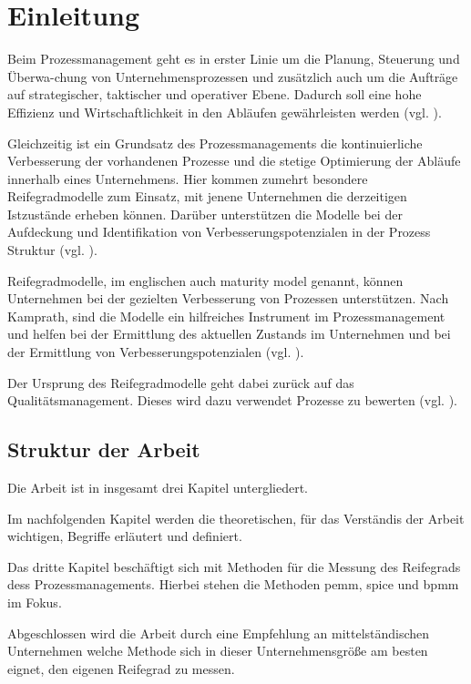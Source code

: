 \newpage
\fancyhead[L]{\textcolor{lightgrey}{\nouppercase{\rightmark}}}

\section{Einleitung}

Beim Prozessmanagement geht es in erster Linie um die Planung, Steuerung und Überwa-chung von Unternehmensprozessen und zusätzlich auch um die
Aufträge auf strategischer, taktischer und operativer Ebene. Dadurch soll eine hohe Effizienz und Wirtschaftlichkeit in den Abläufen gewährleisten
werden (vgl. \cite[S.5]{Schmidt2012}). \par

Gleichzeitig ist ein Grundsatz des Prozessmanagements die kontinuierliche Verbesserung der vorhandenen Prozesse und die stetige Optimierung der Abläufe
innerhalb eines Unternehmens. Hier kommen zumehrt besondere Reifegradmodelle zum Einsatz, mit jenene Unternehmen die derzeitigen Istzustände erheben können. Darüber
unterstützen die Modelle bei der Aufdeckung und Identifikation von Verbesserungspotenzialen in der Prozess Struktur (vgl. \cite[S.1]{Kamprath2011}). \par

Reifegradmodelle, im englischen auch \glqq maturity model\grqq{} genannt, können Unternehmen bei der gezielten Verbesserung von Prozessen unterstützen. Nach Kamprath, sind
die Modelle ein hilfreiches Instrument im Prozessmanagement und helfen bei der Ermittlung des aktuellen Zustands im Unternehmen und bei der Ermittlung von Verbesserungspotenzialen (vgl. \cite[S.1]{Kamprath2011}). \par

Der Ursprung des Reifegradmodelle geht dabei zurück auf das Qualitätsmanagement. Dieses wird dazu verwendet Prozesse zu
bewerten (vgl. \cite[S.8]{Durr2008}).

\subsection{Struktur der Arbeit}

Die Arbeit ist in insgesamt drei Kapitel untergliedert.\par
Im nachfolgenden Kapitel werden die theoretischen, für das Verständis der Arbeit wichtigen, Begriffe erläutert und definiert. \par
Das dritte Kapitel beschäftigt sich mit Methoden für die Messung des Reifegrads dess Prozessmanagements. Hierbei stehen die Methoden \ac{pemm}, \ac{spice} und
\ac{bpmm} im Fokus.\par
Abgeschlossen wird die Arbeit durch eine Empfehlung an mittelständischen Unternehmen welche Methode sich in dieser Unternehmensgröße am besten eignet, den eigenen Reifegrad
zu messen.
